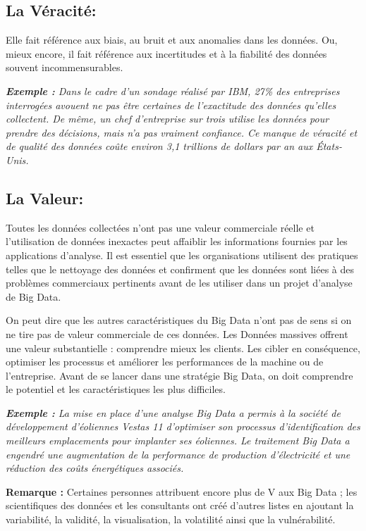 \subsection{La Véracité:}
Elle fait référence aux biais, au bruit et aux anomalies dans les données. Ou, mieux encore, il fait référence aux incertitudes et à la fiabilité des données souvent incommensurables.

\textit{\textbf{Exemple :} Dans le cadre d'un sondage réalisé par IBM, 27\% des entreprises interrogées avouent ne pas être certaines de l'exactitude des données qu'elles collectent. De même, un chef d'entreprise sur trois utilise les données pour prendre des décisions, mais n'a pas vraiment confiance. Ce manque de véracité et de qualité des données coûte environ 3,1 trillions de dollars par an aux États-Unis.}

\subsection{La Valeur:}
Toutes les données collectées n'ont pas une valeur commerciale réelle et l'utilisation de données inexactes peut affaiblir les informations fournies par les applications d'analyse. Il est essentiel que les organisations utilisent des pratiques telles que le nettoyage des données et confirment que les données sont liées à des problèmes commerciaux pertinents avant de les utiliser dans un projet d'analyse de Big Data. 

On peut dire que les autres caractéristiques du Big Data n'ont pas de sens si on ne tire pas de valeur commerciale de ces données. Les Données massives offrent une valeur substantielle : comprendre mieux les clients. Les cibler en conséquence, optimiser les processus et améliorer les performances de la machine ou de l'entreprise. Avant de se lancer dans une stratégie Big Data, on doit comprendre le potentiel et les caractéristiques les plus difficiles.

\textit{\textbf{Exemple :} La mise en place d'une analyse Big Data a permis à la société de développement d'éoliennes Vestas 11 d'optimiser son processus d'identification des meilleurs emplacements pour implanter ses éoliennes. Le traitement Big Data a engendré une augmentation de la performance de production d'électricité et une réduction des coûts énergétiques associés.}

\textbf{Remarque :} Certaines personnes attribuent encore plus de V aux Big Data ; les scientifiques des données et les consultants ont créé d'autres listes en ajoutant la variabilité, la validité, la visualisation, la volatilité ainsi que la vulnérabilité.

